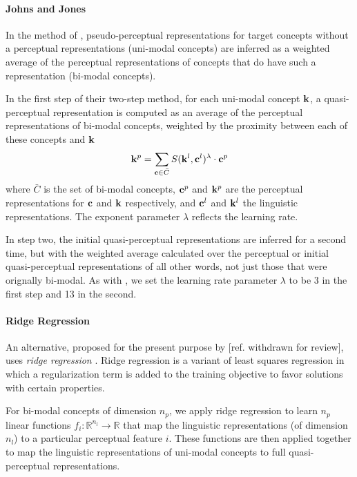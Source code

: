 \documentclass[11pt]{article}
\begin{document}
\paragraph{Johns and Jones}In the method of , pseudo-perceptual representations for target concepts without a perceptual representations (uni-modal concepts) are inferred as a weighted average of the perceptual representations of concepts that do have such a representation (bi-modal concepts). 

In the first step of their two-step method, for each uni-modal concept  \(\bf k\), a quasi-perceptual representation is computed as an average of the perceptual representations of bi-modal concepts, weighted by the proximity between each of these concepts and \( \bf k\)\[{\bf k}^p = \sum_{{\bf c} \in \bar{C}} S({\bf k}^l,{\bf c}^l)^\lambda \cdot {\bf c}^p  \] where \(  \bar{C} \) is the set of bi-modal concepts, \({\bf c}^p\) and  \({\bf k}^p\) are the perceptual representations for \(\bf c\) and \(\bf k\) respectively, and  \({\bf c}^l\) and \({\bf k}^l\) the linguistic representations. The exponent parameter \(\lambda \) reflects the learning rate. 

In step two, the initial quasi-perceptual representations are inferred for a second time, but with the weighted average calculated over the perceptual or initial quasi-perceptual representations of all other words, not just those that were orignally bi-modal. As with , we set the learning rate parameter \( \lambda\) to be 3 in the first step and 13 in the second.  


\paragraph{Ridge Regression}An alternative, proposed for the present purpose by [ref. withdrawn for review], uses \emph{ridge regression} \cite{myers1990classical}. Ridge regression is a variant of least squares regression in which a regularization term is added to the training objective to favor solutions with certain properties. 

For bi-modal concepts of dimension \(n_p\), we apply ridge regression to learn \(n_p\) linear functions \( f_i: \mathbb{R}^{n_l} \to \mathbb{R} \) that map the linguistic representations (of dimension \(n_l\)) to a particular perceptual feature \(i\). These functions are then applied together to map the linguistic representations of uni-modal concepts to full quasi-perceptual representations.
\end{document}
